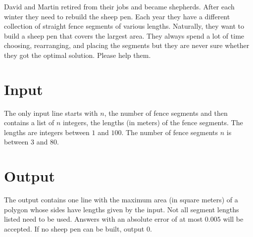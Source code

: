 
David and Martin retired from their jobs and became shepherds. After
each winter they need to rebuild the sheep pen. Each year they have a
different collection of straight fence segments of various
lengths. Naturally, they want to build a sheep pen that covers the
largest area. They always spend a lot of time choosing, rearranging,
and placing the segments but they are never sure whether they got the
optimal solution. Please help them.

\section*{Input}

The only input line starts with $n$, the number of fence segments and then
contains a list of $n$ integers, the lengths (in meters) of the fence
segments. The lengths are integers between $1$ and $100$. The number of
fence segments $n$ is between $3$ and $80$.

\section*{Output}

The output contains one line with the maximum area (in square meters)
of a polygon whose sides have lengths given by the input.  Not all
segment lengths listed need to be used. Answers with an absolute error
of at most $0.005$ will be accepted. If no sheep pen can be built,
output $0$.
